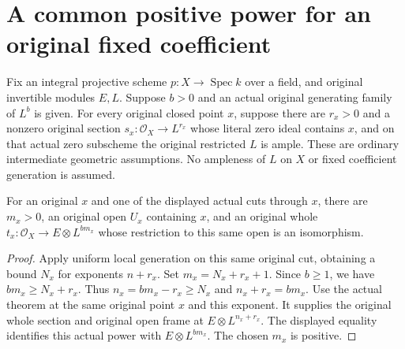 \section{A common positive power for an original fixed coefficient}
Fix an integral projective scheme $p:X\to\operatorname{Spec}k$ over a field,
and original invertible modules $E,L$. Suppose $b>0$ and an actual
original generating family of $L^b$ is given. For every original closed
point $x$, suppose there are $r_x>0$ and a nonzero original section
$s_x:\mathcal O_X\to L^{r_x}$ whose literal zero ideal contains $x$,
and on that actual zero subscheme the original restricted $L$ is ample.
These are ordinary intermediate geometric assumptions. No ampleness
of $L$ on $X$ or fixed coefficient generation is assumed.

\begin{lemma}
\label{lem:fixed-coefficient-closed-point-multiple-frame}
For an original $x$ and one of the displayed actual cuts through $x$,
there are $m_x>0$, an original open $U_x$ containing $x$, and an
original whole $t_x:\mathcal O_X\to E\otimes L^{b m_x}$ whose
restriction to this same open is an isomorphism.
\end{lemma}
\begin{proof}
Apply uniform local generation on this same original cut, obtaining a
bound $N_x$ for exponents $n+r_x$. Set $m_x=N_x+r_x+1$.
Since $b\ge1$, we have $b m_x\ge N_x+r_x$.
Thus $n_x=b m_x-r_x\ge N_x$ and $n_x+r_x=b m_x$.
Use the actual theorem at the same original point $x$ and this exponent.
It supplies the original whole section and original open frame at
$E\otimes L^{n_x+r_x}$. The displayed equality identifies this actual
power with $E\otimes L^{b m_x}$. The chosen $m_x$ is positive.
\end{proof}


